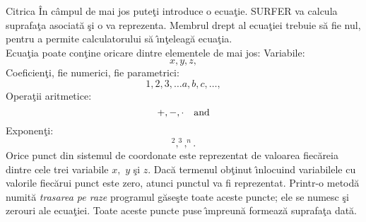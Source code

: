 \begin{surferPage}{Citrica}
\^In c\^ampul de mai jos pute\c ti introduce o ecua\c tie. SURFER va calcula suprafa\c ta asociat\u a \c si o va reprezenta. Membrul drept al ecua\c tiei trebuie s\u a fie nul, pentru a permite calculatorului s\u a \^{\i}n\c teleag\u a ecua\c tia.\\
Ecua\c tia poate con\c tine oricare dintre elementele de mai jos:
\newline
Variabile:
\[x, y, z, \]
Coeficien\c ti, fie numerici, fie parametrici:
\[1, 2, 3, \dots a, b, c, \dots, \]
Opera\c tii aritmetice:
\[+,  - , \cdot \quad \textnormal{and} \]
Exponen\c ti:
\[ ^2, ^3, ^n .\]
Orice punct din sistemul de coordonate este reprezentat de valoarea fiec\u areia dintre cele trei variabile $x,$ $y$ \c si $z.$ Dac\u a termenul ob\c tinut \^{\i}nlocuind variabilele cu valorile fiec\u arui punct este zero, atunci punctul va fi reprezentat. Printr-o metod\u a numit\u a \textit{trasarea pe raze} programul g\u ase\c ste toate aceste puncte; ele se numesc \c si zerouri ale ecua\c tiei. Toate aceste puncte puse \^{\i}mpreun\u a formeaz\u a suprafa\c ta dat\u a.
\end{surferPage}